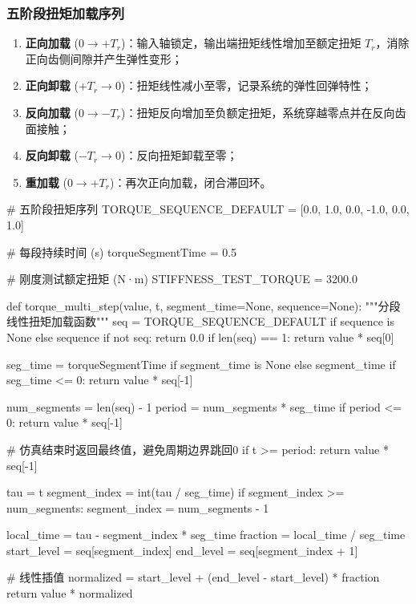 \documentclass[12pt]{ctexart}
\begin{document}
\subsubsection{五阶段扭矩加载序列}
\begin{enumerate}
    \item \textbf{正向加载} ($0 \to +T_r$)：输入轴锁定，输出端扭矩线性增加至额定扭矩 $T_r$，消除正向齿侧间隙并产生弹性变形；
    \item \textbf{正向卸载} ($+T_r \to 0$)：扭矩线性减小至零，记录系统的弹性回弹特性；
    \item \textbf{反向加载} ($0 \to -T_r$)：扭矩反向增加至负额定扭矩，系统穿越零点并在反向齿面接触；
    \item \textbf{反向卸载} ($-T_r \to 0$)：反向扭矩卸载至零；
    \item \textbf{重加载} ($0 \to +T_r$)：再次正向加载，闭合滞回环。
\end{enumerate}

\begin{pythoncode}[扭矩序列定义与加载函数]
# 五阶段扭矩序列
TORQUE_SEQUENCE_DEFAULT = [0.0, 1.0, 0.0, -1.0, 0.0, 1.0]

# 每段持续时间 (s)
torqueSegmentTime = 0.5

# 刚度测试额定扭矩 (N·m)
STIFFNESS_TEST_TORQUE = 3200.0

def torque_multi_step(value, t, segment_time=None, sequence=None):
    """分段线性扭矩加载函数"""
    seq = TORQUE_SEQUENCE_DEFAULT if sequence is None else sequence
    if not seq:
        return 0.0
    if len(seq) == 1:
        return value * seq[0]

    seg_time = torqueSegmentTime if segment_time is None else segment_time
    if seg_time <= 0:
        return value * seq[-1]

    num_segments = len(seq) - 1
    period = num_segments * seg_time
    if period <= 0:
        return value * seq[-1]

    # 仿真结束时返回最终值，避免周期边界跳回0
    if t >= period:
        return value * seq[-1]

    tau = t %
    segment_index = int(tau / seg_time)
    if segment_index >= num_segments:
        segment_index = num_segments - 1

    local_time = tau - segment_index * seg_time
    fraction = local_time / seg_time
    start_level = seq[segment_index]
    end_level = seq[segment_index + 1]

    # 线性插值
    normalized = start_level + (end_level - start_level) * fraction
    return value * normalized
\end{pythoncode}
\end{document}
